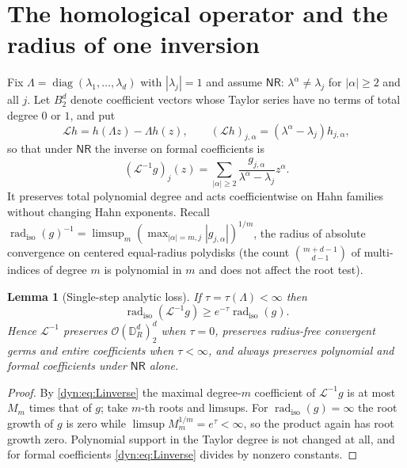 \documentclass[11pt,letterpaper]{article}
\newtheorem{lemma}[lemma]{Lemma}
\theoremstyle{definition}
\theoremstyle{remark}
\newcommand{\OO}{\mathcal O}
\newcommand{\radiso}{\operatorname{rad}_{\mathrm{iso}}}
\newcommand{\Li}{\mathcal L}
\newcommand{\nres}{\mathsf{NR}}
\numberwithin{equation}{section}
\begin{document}
\section{The homological operator and the radius of one inversion}
\label{dyn:sec:divisors}
\label{dyn:subsec:homological}

Fix $\Lambda=\operatorname{diag}(\lambda_1,\dots,\lambda_d)$ with
$|\lambda_j|=1$ and assume $\nres$: $\lambda^{\alpha}\ne\lambda_j$ for
$|\alpha|\ge2$ and all $j$. Let $B_2^{d}$ denote coefficient vectors whose
Taylor series have no terms of total degree $0$ or $1$, and put
\begin{equation}\label{dyn:eq:homological}
 \Li h=h(\Lambda z)-\Lambda h(z),\qquad
 (\Li h)_{j,\alpha}=(\lambda^{\alpha}-\lambda_j)h_{j,\alpha},
\end{equation}
so that under $\nres$ the inverse on formal coefficients is
\begin{equation}\label{dyn:eq:Linverse}
 (\Li^{-1}g)_j(z)=\sum_{|\alpha|\ge2}
 \frac{g_{j,\alpha}}{\lambda^{\alpha}-\lambda_j}z^{\alpha}.
\end{equation}
It preserves total polynomial degree and acts coefficientwise on Hahn
families without changing Hahn exponents. Recall
$\radiso(g)^{-1}=\limsup_m(\max_{|\alpha|=m,j}|g_{j,\alpha}|)^{1/m}$, the
radius of absolute convergence on centered equal-radius polydisks (the
count $\binom{m+d-1}{d-1}$ of multi-indices of degree $m$ is polynomial in
$m$ and does not affect the root test).

\begin{lemma}[Single-step analytic loss]\label{dyn:lem:radius-loss}
If $\tau=\tau(\Lambda)<\infty$ then
\begin{equation}\label{dyn:eq:loss}
 \radiso(\Li^{-1}g)\ge e^{-\tau}\radiso(g).
\end{equation}
Hence $\Li^{-1}$ preserves $\OO(\mathbb D_R^{d})_2^{d}$ when $\tau=0$,
preserves radius-free convergent germs and entire coefficients when
$\tau<\infty$, and always preserves polynomial and formal coefficients
under $\nres$ alone.
\end{lemma}
\begin{proof}
By \eqref{dyn:eq:Linverse} the maximal degree-$m$ coefficient of
$\Li^{-1}g$ is at most $M_m$ times that of $g$; take $m$-th roots and
limsups. For $\radiso(g)=\infty$ the root growth of $g$ is zero while
$\limsup M_m^{1/m}=e^{\tau}<\infty$, so the product again has root growth
zero. Polynomial support in the Taylor degree is not changed at all, and
for formal coefficients \eqref{dyn:eq:Linverse} divides by nonzero
constants.
\end{proof}
\end{document}
